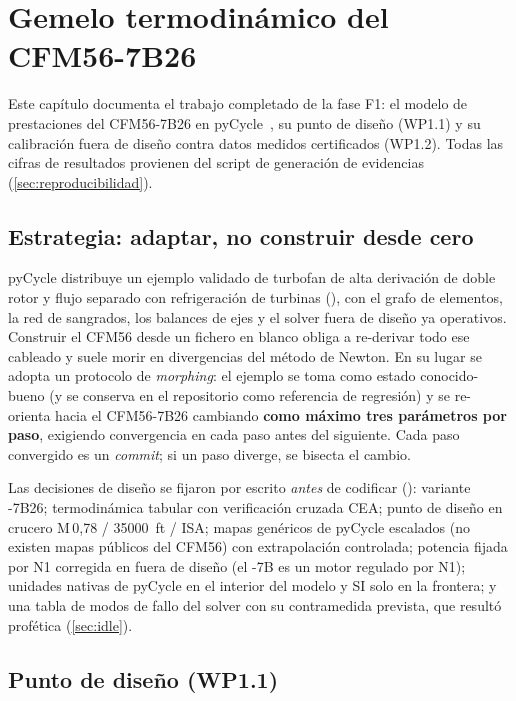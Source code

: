 \chapter{Gemelo termodinámico del CFM56-7B26}
\label{cap:modelo}

Este capítulo documenta el trabajo completado de la fase F1: el modelo de prestaciones del
CFM56-7B26 en pyCycle~\cite{Hendricks2019}, su punto de diseño (WP1.1) y su calibración fuera de
diseño contra datos medidos certificados (WP1.2). Todas las cifras de resultados provienen del
script de generación de evidencias (\cref{sec:reproducibilidad}).

\section{Estrategia: adaptar, no construir desde cero}
\label{sec:morph}

pyCycle distribuye un ejemplo validado de turbofan de alta derivación de doble rotor y flujo
separado con refrigeración de turbinas (), con el grafo de
elementos, la red de sangrados, los balances de ejes y el solver fuera de diseño ya operativos.
Construir el CFM56 desde un fichero en blanco obliga a re-derivar todo ese cableado y suele
morir en divergencias del método de Newton. En su lugar se adopta un protocolo de
\emph{morphing}: el ejemplo se toma como estado conocido-bueno (y se conserva en el repositorio
como referencia de regresión) y se re-orienta hacia el CFM56-7B26 cambiando \textbf{como máximo
tres parámetros por paso}, exigiendo convergencia en cada paso antes del siguiente. Cada paso
convergido es un \emph{commit}; si un paso diverge, se bisecta el cambio.

Las decisiones de diseño se fijaron por escrito \emph{antes} de codificar
(): variante -7B26; termodinámica tabular con verificación cruzada
CEA; punto de diseño en crucero M\,0,78 / \SI{35000}{ft} / ISA; mapas genéricos de pyCycle
escalados (no existen mapas públicos del CFM56) con extrapolación controlada; potencia fijada
por N1 corregida en fuera de diseño (el -7B es un motor regulado por N1); unidades nativas de
pyCycle en el interior del modelo y SI solo en la frontera; y una tabla de modos de fallo del
solver con su contramedida prevista, que resultó profética (\cref{sec:idle}).

\section{Punto de diseño (WP1.1)}
\label{sec:diseno}

